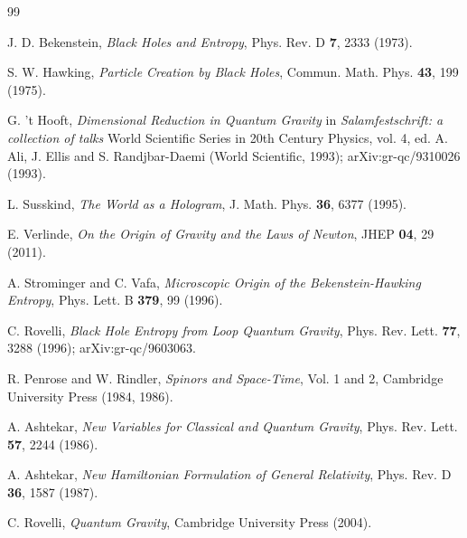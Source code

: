 \documentclass[11pt,a4paper]{article}
\theoremstyle{definition}
\begin{document}
	\begin{thebibliography}{99}
		
		
		J. D. Bekenstein, \emph{Black Holes and Entropy}, Phys. Rev. D \textbf{7}, 2333 (1973).
		
		S. W. Hawking, \emph{Particle Creation by Black Holes}, Commun. Math. Phys. \textbf{43}, 199 (1975).
		
		G. 't Hooft, \emph{Dimensional Reduction in Quantum Gravity} in \emph{Salamfestschrift: a collection of talks} World Scientific Series in 20th Century Physics, vol. 4, ed. A. Ali, J. Ellis and S. Randjbar-Daemi (World Scientific, 1993); arXiv:gr-qc/9310026 (1993).
		
		L. Susskind, \emph{The World as a Hologram}, J. Math. Phys. \textbf{36}, 6377 (1995).
		
		E. Verlinde, \emph{On the Origin of Gravity and the Laws of Newton}, JHEP \textbf{04}, 29 (2011).
		
		A. Strominger and C. Vafa, \emph{Microscopic Origin of the Bekenstein-Hawking Entropy}, Phys. Lett. B \textbf{379}, 99 (1996).
		
		C. Rovelli, \emph{Black Hole Entropy from Loop Quantum Gravity}, Phys. Rev. Lett. \textbf{77}, 3288 (1996); arXiv:gr-qc/9603063.
		
		R. Penrose and W. Rindler, \emph{Spinors and Space-Time}, Vol. 1 and 2, Cambridge University Press (1984, 1986).
		
		
		A. Ashtekar, \emph{New Variables for Classical and Quantum Gravity}, Phys. Rev. Lett. \textbf{57}, 2244 (1986).
		
		A. Ashtekar, \emph{New Hamiltonian Formulation of General Relativity}, Phys. Rev. D \textbf{36}, 1587 (1987).
		
		C. Rovelli, \emph{Quantum Gravity}, Cambridge University Press (2004).
		

\end{thebibliography}
\end{document}
